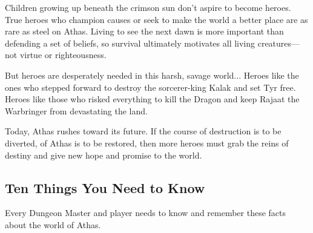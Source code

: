 Children growing up beneath the crimson sun don't aspire to become heroes. True heroes who champion causes or seek to make the world a better place are as rare as steel on Athas. Living to see the next dawn is more important than defending a set of beliefs, so survival ultimately motivates all living creatures---not virtue or righteousness.

But heroes are desperately needed in this harsh, savage world... Heroes like the ones who stepped forward to destroy the sorcerer-king Kalak and set Tyr free. Heroes like those who risked everything to kill the Dragon and keep Rajaat the Warbringer from devastating the land.

Today, Athas rushes toward its future. If the course of destruction is to be diverted, of Athas is to be restored, then more heroes must grab the reins of destiny and give new hope and promise to the world.

\subsection{Ten Things You Need to Know}
Every Dungeon Master and player needs to know and remember these facts about the world of Athas.

